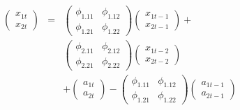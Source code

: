 

\begin{eqnarray*}
\left( \begin{array}{c} x_{1t} \\ x_{2t} \end{array} \right) & = & \left( \begin{array}{cc} \phi_{1.11} & \phi_{1.12} \\ \phi_{1.21} & \phi_{1.22} \end{array} \right)  \left( \begin{array}{c}  x_{1t-1} \\ x_{2t-1} \end{array} \right)  + \\
 & & \left( \begin{array}{cc} \phi_{2.11} & \phi_{2.12} \\ \phi_{2.21} & \phi_{2.22} \end{array} \right)  \left( \begin{array}{c}  x_{1t-2} \\ x_{2t-2} \end{array} \right) \\
 & &  + \left( \begin{array}{c} a_{1t} \\ a_{2t} \end{array} \right) - \left( \begin{array}{cc} \phi_{1.11} & \phi_{1.12} \\ \phi_{1.21} & \phi_{1.22} \end{array} \right) \left( \begin{array}{c} a_{1t-1} \\ a_{2t-1} \end{array} \right)
\end{eqnarray*}


